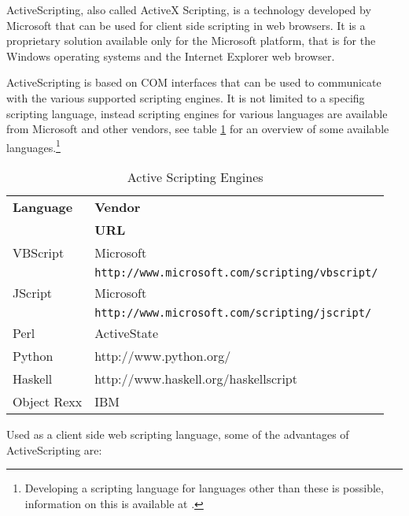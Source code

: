 ActiveScripting, also called ActiveX Scripting, is a technology developed by Microsoft that can be used for client side scripting in web browsers. It is a proprietary solution available only for the Microsoft platform, that is for the Windows operating systems and the Internet Explorer web browser.

ActiveScripting is based on COM interfaces that can be used to communicate with the various supported scripting engines. It is not limited to a specifig scripting language, instead scripting engines for various languages are available from Microsoft and other vendors, see table  \ref{tab:ActiveScriptingEngines} for an overview of some available languages.\footnote{Developing a scripting language for languages other than these is possible, information on this is available at \cite{MsCreateSE}.}


\begin{table}
	\centering
		\begin{tabular}{ll}
			\textbf{Language}& \textbf{Vendor} \\
			& \textbf{URL} \\
			VBScript & Microsoft \\
			& \texttt{http://www.microsoft.com/scripting/vbscript/} \\
			JScript & Microsoft \\
			& \texttt{http://www.microsoft.com/scripting/jscript/} \\
			Perl & ActiveState \\
			Python & \sffamily http://www.python.org/ \\
			Haskell & \sffamily http://www.haskell.org/haskellscript \\
			Object Rexx & IBM \\
			
		\end{tabular}
	\caption{Active Scripting Engines}
	\label{tab:ActiveScriptingEngines}
\end{table}


Used as a client side web scripting language, some of the advantages of ActiveScripting are:

